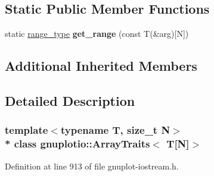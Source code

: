 \subsection*{Static Public Member Functions}
\begin{DoxyCompactItemize}
\item 
static \hyperlink{classgnuplotio_1_1_iterator_range}{range\+\_\+type} {\bfseries get\+\_\+range} (const T(\&arg)\mbox{[}N\mbox{]})\hypertarget{classgnuplotio_1_1_array_traits_3_01_t[_n]_4_adc9c1ce6da4923418f367e08c150a928}{}\label{classgnuplotio_1_1_array_traits_3_01_t[_n]_4_adc9c1ce6da4923418f367e08c150a928}

\end{DoxyCompactItemize}
\subsection*{Additional Inherited Members}


\subsection{Detailed Description}
\subsubsection*{template$<$typename T, size\+\_\+t N$>$\\*
class gnuplotio\+::\+Array\+Traits$<$ T\mbox{[}\+N\mbox{]}$>$}



Definition at line 913 of file gnuplot-\/iostream.\+h.


